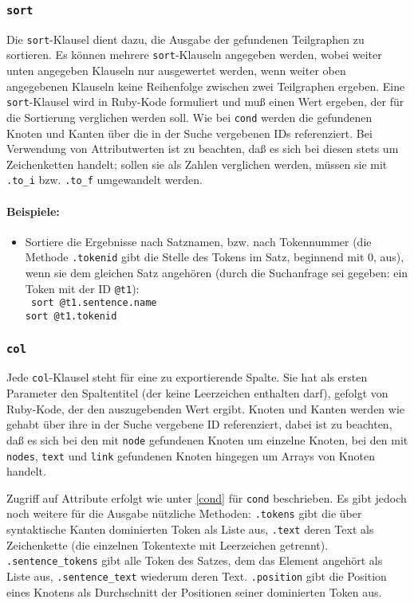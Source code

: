 \documentclass[12pt]{scrartcl}
\begin{document}
\subsubsection{\texttt{sort}}

Die \texttt{sort}-Klausel dient dazu, die Ausgabe der gefundenen Teilgraphen zu sortieren. Es können mehrere \texttt{sort}-Klauseln angegeben werden, wobei weiter unten angegeben Klauseln nur ausgewertet werden, wenn  weiter oben angegebenen Klauseln keine Reihenfolge zwischen zwei Teilgraphen ergeben.
Eine \texttt{sort}-Klausel wird in Ruby-Kode formuliert und muß einen Wert ergeben, der für die Sortierung verglichen werden soll. Wie bei \texttt{cond} werden die gefundenen Knoten und Kanten über die in der Suche vergebenen IDs referenziert. Bei Verwendung von Attributwerten ist zu beachten, daß es sich bei diesen stets um Zeichenketten handelt; sollen sie als Zahlen verglichen werden, müssen sie mit \texttt{.to\_i} bzw. \texttt{.to\_f} umgewandelt werden.

\paragraph*{Beispiele:}
\begin{itemize}
	\item Sortiere die Ergebnisse nach Satznamen, bzw. nach Tokennummer (die Methode \texttt{.tokenid} gibt die Stelle des Tokens im Satz, beginnend mit 0, aus), wenn sie dem gleichen Satz angehören (durch die Suchanfrage sei gegeben: ein Token mit der ID \texttt{@t1}):\\
	{\tt
	sort @t1.sentence.name\\[-.4ex]
	sort @t1.tokenid\\[-.4ex]
	}
\end{itemize}



\subsubsection{\texttt{col}}

Jede \texttt{col}-Klausel steht für eine zu exportierende Spalte. Sie hat als ersten Parameter den Spaltentitel (der keine Leerzeichen enthalten darf), gefolgt von Ruby-Kode, der den auszugebenden Wert ergibt. Knoten und Kanten werden wie gehabt über ihre in der Suche vergebene ID referenziert, dabei ist zu beachten, daß es sich bei den mit \texttt{node} gefundenen Knoten um einzelne Knoten, bei den mit \texttt{nodes}, \texttt{text} und \texttt{link} gefundenen Knoten hingegen um Arrays von Knoten handelt.

Zugriff auf Attribute erfolgt wie unter \ref{cond} für \texttt{cond} beschrieben. Es gibt jedoch noch weitere für die Ausgabe nützliche Methoden: \texttt{.tokens} gibt die über syntaktische Kanten dominierten Token als Liste aus, \texttt{.text} deren Text als Zeichenkette (die einzelnen Tokentexte mit Leerzeichen getrennt). \texttt{.sentence\_tokens} gibt alle Token des Satzes, dem das Element angehört als Liste aus, \texttt{.sentence\_text} wiederum deren Text. \texttt{.position} gibt die Position eines Knotens als Durchschnitt der Positionen seiner dominierten Token aus.
\end{document}
